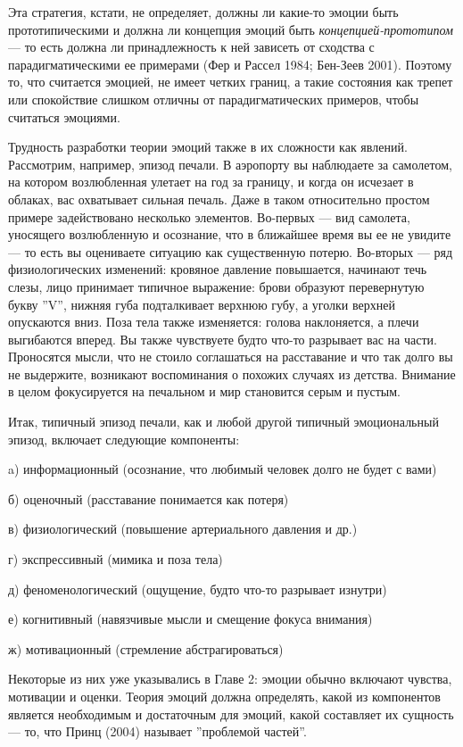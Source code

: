 \documentclass[11pt]{book}
\begin{document}
Эта стратегия, кстати, не определяет, должны ли какие-то эмоции быть прототипическими и должна ли концепция эмоций быть \textit{концепцией-прототипом} --- то есть должна ли принадлежность к ней зависеть от сходства с парадигматическими ее примерами (Фер и Рассел 1984; Бен-Зеев 2001). Поэтому то, что считается эмоцией, не имеет четких границ, а такие состояния как трепет или спокойствие слишком отличны от парадигматических примеров, чтобы считаться эмоциями.

Трудность разработки теории эмоций также в их сложности как явлений. Рассмотрим, например, эпизод печали. В аэропорту вы наблюдаете за самолетом, на котором возлюбленная улетает на год за границу, и когда он исчезает в облаках, вас охватывает сильная печаль. Даже в таком относительно простом примере задействовано несколько элементов. Во-первых --- вид самолета, уносящего возлюбленную и осознание, что в ближайшее время вы ее не увидите --- то есть вы оцениваете ситуацию как существенную потерю. Во-вторых --- ряд физиологических изменений: кровяное давление повышается, начинают течь слезы, лицо принимает типичное выражение: брови образуют перевернутую букву ''V'', нижняя губа подталкивает верхнюю губу, а уголки верхней опускаются вниз. Поза тела также изменяется: голова наклоняется, а плечи выгибаются вперед. Вы также чувствуете будто что-то разрывает вас на части. Проносятся мысли, что не стоило соглашаться на расставание и что так долго вы не выдержите, возникают воспоминания о похожих случаях из детства. Внимание в целом фокусируется на печальном и мир становится серым и пустым.

Итак, типичный эпизод печали, как и любой другой типичный эмоциональный эпизод, включает следующие компоненты:

a) информационный (осознание, что любимый человек долго не будет с вами)

б) оценочный (расставание понимается как потеря)

в) физиологический (повышение артериального давления и др.)

г) экспрессивный (мимика и поза тела)

д) феноменологический (ощущение, будто что-то разрывает изнутри)

е) когнитивный (навязчивые мысли и смещение фокуса внимания)

ж) мотивационный (стремление абстрагироваться)

Некоторые из них уже указывались в Главе 2: эмоции обычно включают чувства, мотивации и оценки. Теория эмоций должна определять, какой из компонентов является необходимым и достаточным для эмоций, какой составляет их сущность --- то, что Принц (2004) называет ''проблемой частей''.
\end{document}
